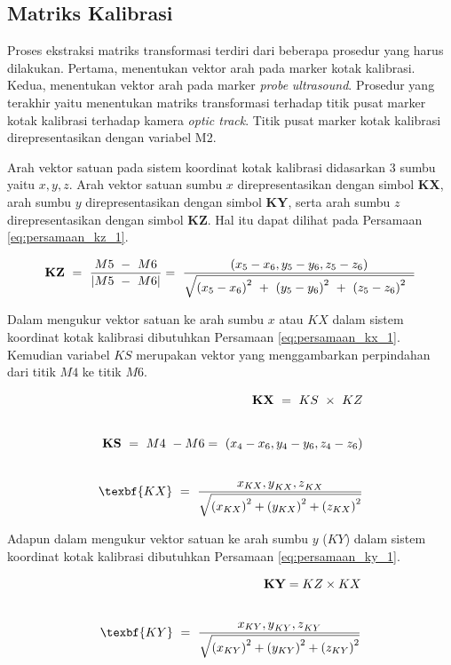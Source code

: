 \subsection{Matriks Kalibrasi}
Proses ekstraksi matriks transformasi terdiri dari beberapa prosedur yang harus dilakukan. Pertama, menentukan vektor arah pada marker kotak kalibrasi. Kedua, menentukan vektor arah pada marker \textit{probe} \textit{ultrasound}. Prosedur yang terakhir yaitu menentukan matriks transformasi terhadap titik pusat marker kotak kalibrasi terhadap kamera \textit{optic track}. Titik pusat marker kotak kalibrasi direpresentasikan dengan variabel M2.

Arah vektor satuan pada sistem koordinat kotak kalibrasi didasarkan 3 sumbu yaitu $x,y,z$. Arah vektor satuan sumbu $x$ direpresentasikan dengan simbol \textbf{KX}, arah sumbu $y$ direpresentasikan dengan simbol \textbf{KY}, serta arah sumbu $z$ direpresentasikan dengan simbol \textbf{KZ}. Hal itu dapat dilihat pada Persamaan \ref{eq:persamaan_kz_1}.

\begin{equation}
	\textbf{KZ}\ =\ \frac{M5\ -\ M6}{\left|M5\ -\ M6\right|} \\
	=\ \frac{(x_5-x_6,y_5-y_6,z_5-z_6)}{\sqrt{{(x_5-x_6)}^2\ +\ {(y_5-y_6)}^2\ +\ {(z_5-z_6)}^2\ \ }}
	\label{eq:persamaan_kz_1}
\end{equation}

Dalam mengukur vektor satuan ke arah sumbu $x$ atau $KX$ dalam sistem koordinat kotak kalibrasi dibutuhkan Persamaan \ref{eq:persamaan_kx_1}. Kemudian variabel $KS$ merupakan vektor yang menggambarkan perpindahan dari titik $M4$ ke titik $M6$.

\begin{equation}
	\begin{aligned}
		\textbf{KX}\ =\ KS\ \times\ KZ \\[20pt]
		\textbf{KS}\ =\ M4\ -M6 =\ (x_4-x_6,y_4-y_6,z_4-z_6) \\[20pt] 
		\texbf{KX}\ =\ \frac{x_{KX}{,y}_{KX}{,z}_{KX}}{\sqrt{{(x_{KX})}^2+{(y_{KX})}^2+{(z_{KX})}^2}}
	\end{aligned}
	\label{eq:persamaan_kx_1}
\end{equation}

Adapun dalam mengukur vektor satuan ke arah sumbu $y$ ($KY$) dalam sistem koordinat kotak kalibrasi dibutuhkan Persamaan \ref{eq:persamaan_ky_1}. 

\begin{equation}
	\begin{aligned}
		\textbf{KY} = KZ \times KX \\[20pt]
		 \texbf{KY}\ =\ \frac{x_{KY}{,y}_{KY}{,z}_{KY}}{\sqrt{{(x_{KY})}^2+{(y_{KY})}^2+{(z_{KY})}^2}}
	\end{aligned}
	\label{eq:persamaan_ky_1}
\end{equation}  

